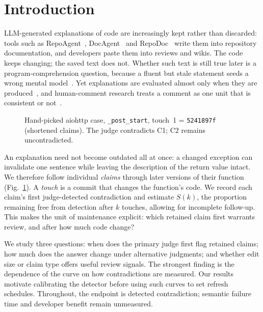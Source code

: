 \section{Introduction}\label{sec:intro}

LLM-generated explanations of code are increasingly kept rather than discarded: tools such as RepoAgent~\cite{luo2024repoagent}, DocAgent~\cite{yang2025docagent} and RepoDoc~\cite{xu2026repodoc} write them into repository documentation, and developers paste them into reviews and wikis. The code keeps changing; the saved text does not. Whether such text is still true later is a program-comprehension question, because a fluent but stale statement seeds a wrong mental model~\cite{vonmayrhauser1995}. Yet explanations are evaluated almost only when they are produced~\cite{khatib2026mutation,bae2026referee,maharaj2024etf}, and human-comment research treats a comment as one unit that is consistent or not~\cite{wen2019large,panthaplackel2021deep}.

\begin{figure}[!t]
\centering
%
\caption{Hand-picked aiohttp case, \texttt{\_post\_start}, touch~1 = \texttt{5241897f} (shortened claims). The judge contradicts C1; C2 remains uncontradicted.}
\label{fig:example}
\end{figure}

An explanation need not become outdated all at once: a changed exception can invalidate one sentence while leaving the description of the return value intact. We therefore follow individual \emph{claims} through later versions of their function (Fig.~\ref{fig:example}). A \emph{touch} is a commit that changes the function's code. We record each claim's first judge-detected contradiction and estimate $S(k)$, the proportion remaining free from detection after $k$ touches, allowing for incomplete follow-up. This makes the unit of maintenance explicit: which retained claim first warrants review, and after how much code change?

We study three questions: when does the primary judge first flag retained claims; how much does the answer change under alternative judgments; and whether edit size or claim type offers useful review signals. The strongest finding is the dependence of the curve on how contradictions are measured. Our results motivate calibrating the detector before using such curves to set refresh schedules. Throughout, the endpoint is detected contradiction; semantic failure time and developer benefit remain unmeasured.

